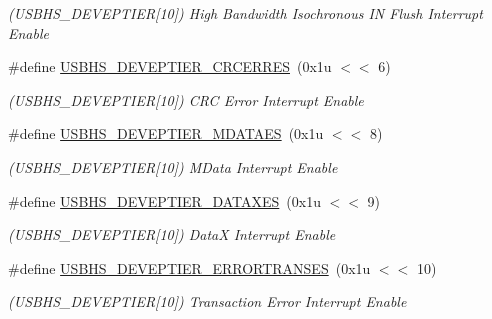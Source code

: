 \begin{DoxyCompactItemize}
\begin{DoxyCompactList}\small\item\em (U\+S\+B\+H\+S\+\_\+\+D\+E\+V\+E\+P\+T\+I\+ER\mbox{[}10\mbox{]}) High Bandwidth Isochronous IN Flush Interrupt Enable \end{DoxyCompactList}\item 
\mbox{\label{group__SAMV71__USBHS_ga07e37d9a679da1fba5def79ccf2a498e}} 
\#define \mbox{\hyperlink{group__SAMV71__USBHS_ga07e37d9a679da1fba5def79ccf2a498e}{U\+S\+B\+H\+S\+\_\+\+D\+E\+V\+E\+P\+T\+I\+E\+R\+\_\+\+C\+R\+C\+E\+R\+R\+ES}}~(0x1u $<$$<$ 6)
\begin{DoxyCompactList}\small\item\em (U\+S\+B\+H\+S\+\_\+\+D\+E\+V\+E\+P\+T\+I\+ER\mbox{[}10\mbox{]}) C\+RC Error Interrupt Enable \end{DoxyCompactList}\item 
\mbox{\label{group__SAMV71__USBHS_ga4fbb7b3cdc6a6fd2701ace359856cee9}} 
\#define \mbox{\hyperlink{group__SAMV71__USBHS_ga4fbb7b3cdc6a6fd2701ace359856cee9}{U\+S\+B\+H\+S\+\_\+\+D\+E\+V\+E\+P\+T\+I\+E\+R\+\_\+\+M\+D\+A\+T\+A\+ES}}~(0x1u $<$$<$ 8)
\begin{DoxyCompactList}\small\item\em (U\+S\+B\+H\+S\+\_\+\+D\+E\+V\+E\+P\+T\+I\+ER\mbox{[}10\mbox{]}) M\+Data Interrupt Enable \end{DoxyCompactList}\item 
\mbox{\label{group__SAMV71__USBHS_ga0162e1889ef91809937c8e0bd91d1a68}} 
\#define \mbox{\hyperlink{group__SAMV71__USBHS_ga0162e1889ef91809937c8e0bd91d1a68}{U\+S\+B\+H\+S\+\_\+\+D\+E\+V\+E\+P\+T\+I\+E\+R\+\_\+\+D\+A\+T\+A\+X\+ES}}~(0x1u $<$$<$ 9)
\begin{DoxyCompactList}\small\item\em (U\+S\+B\+H\+S\+\_\+\+D\+E\+V\+E\+P\+T\+I\+ER\mbox{[}10\mbox{]}) DataX Interrupt Enable \end{DoxyCompactList}\item 
\mbox{\label{group__SAMV71__USBHS_gab8a4312a4fef51e62f9bc659228378e2}} 
\#define \mbox{\hyperlink{group__SAMV71__USBHS_gab8a4312a4fef51e62f9bc659228378e2}{U\+S\+B\+H\+S\+\_\+\+D\+E\+V\+E\+P\+T\+I\+E\+R\+\_\+\+E\+R\+R\+O\+R\+T\+R\+A\+N\+S\+ES}}~(0x1u $<$$<$ 10)
\begin{DoxyCompactList}\small\item\em (U\+S\+B\+H\+S\+\_\+\+D\+E\+V\+E\+P\+T\+I\+ER\mbox{[}10\mbox{]}) Transaction Error Interrupt Enable \end{DoxyCompactList}\item 

\end{DoxyCompactItemize}
